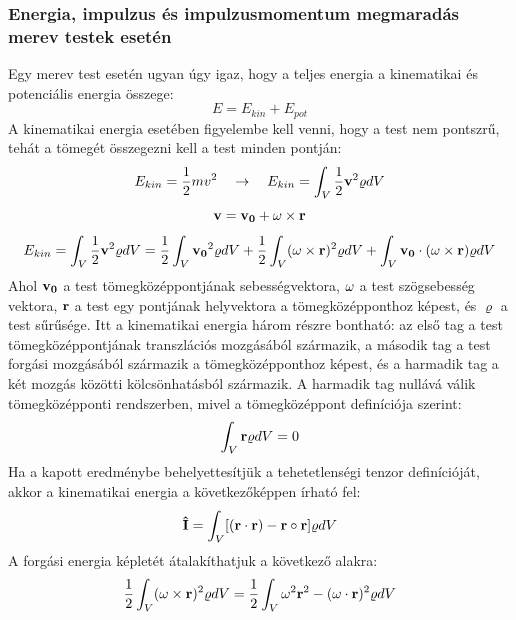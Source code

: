 \documentclass[a4paper,12pt]{article}
\begin{document}
\subsubsection{Energia, impulzus és impulzusmomentum megmaradás merev testek esetén}
Egy merev test esetén ugyan úgy igaz, hogy a teljes energia a kinematikai és potenciális energia összege:
\begin{equation}
    E = E_{kin} + E_{pot}
\end{equation}
A kinematikai energia esetében figyelembe kell venni, hogy a test nem pontszrű, tehát a tömegét összegezni kell a test minden pontján:
\begin{equation}
    E_{kin} = \frac{1}{2} m v^2 \quad \rightarrow \quad E_{kin} = \int_{V} \frac{1}{2} \bold{v}^2 \varrho dV
\end{equation}
\begin{equation}
    \bold{v} = \bold{v_0} + \bold{\omega} \times \bold{r}
\end{equation}
\begin{equation}
    E_{kin} = \int_{V} \frac{1}{2} \bold{v}^2 \varrho dV = \frac{1}{2} \int_{V} \bold{v_0}^2 \varrho dV + \frac{1}{2} \int_{V} (\bold{\omega} \times \bold{r})^2 \varrho dV + \int_{V} \bold{v_0} \cdot (\bold{\omega} \times \bold{r}) \varrho dV
\end{equation}
Ahol $\bold{v_0}$ a test tömegközéppontjának sebességvektora, $\bold{\omega}$ a test szögsebesség vektora, $\bold{r}$ a test egy pontjának helyvektora a tömegközépponthoz képest, és $\varrho$ a test sűrűsége.
Itt a kinematikai energia három részre bontható: az első tag a test tömegközéppontjának transzlációs mozgásából származik, a második tag a test forgási mozgásából származik a tömegközépponthoz képest, és a harmadik tag a két mozgás közötti kölcsönhatásból származik.
A harmadik tag nullává válik tömegközépponti rendszerben, mivel a tömegközéppont definíciója szerint:
\begin{equation}
    \int_{V} \bold{r} \varrho dV = 0
\end{equation}
Ha a kapott eredménybe behelyettesítjük a tehetetlenségi tenzor definícióját, akkor a kinematikai energia a következőképpen írható fel:
\begin{equation}
    \bold{\hat{I}} = \int_{V} [(\bold{r} \cdot \bold{r}) - \bold{r} \circ \bold{r}] \varrho dV
\end{equation}
A forgási energia képletét átalakíthatjuk a következő alakra:
\begin{equation}
    \frac{1}{2} \int_{V} (\bold{\omega} \times \bold{r})^2 \varrho dV = \frac{1}{2} \int_{V} \omega^2 \bold{r}^2 - (\bold{\omega} \cdot \bold{r})^2 \varrho dV
\end{equation}
\end{document}
